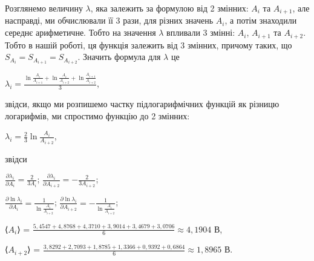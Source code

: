 \documentclass[12pt,a4paper]{article}
\begin{document}
    \vspace{1em} %

    Розглянемо величину $\lambda$, яка залежить за формулою від 2 змінних: $A_i$ та $A_{i+1}$, але насправді, ми обчислювали її 3 рази, для різних значень $A_i$, а потім знаходили середнє арифметичне.
    Тобто на значення $\lambda$ впливали 3 змінні: $A_i$, $A_{i+1}$ та $A_{i+2}$. Тобто в нашій роботі, ця функція залежить від 3 змінних, причому таких, що $S_{A_i} = S_{A_{i+1}} = S_{A_{i+2}}$.
    Значить формула для $\lambda$ це 
        
    \begin{center}
        $\displaystyle \lambda_i = \frac{\ln \frac{A_i}{A_{i+1}} + \ln \frac{A_i}{A_{i+2}} + \ln \frac{A_{i+1}}{A_{i+2}}}{3}$,
    \end{center}

    звідси, якщо ми розпишемо частку підлогарифмічних функцій як різницю логарифмів, ми спростимо функцію до 2 змінних:

    \begin{center}
        $\displaystyle \lambda_i = \frac{2}{3} \ln \frac{A_i}{A_{i+2}}$,
    \end{center}

    звідси

    \begin{center}
        $\displaystyle \frac{\partial \lambda_i}{\partial A_i} = \frac{2}{3A_i}$; $\displaystyle \frac{\partial \lambda_i}{\partial A_{i+2}} = -\frac{2}{3A_{i+2}}$;
    \end{center}

    \begin{center}
        $\displaystyle \frac{\partial \ln \lambda_i}{\partial A_i} = \frac{1}{\ln \frac{A_i}{A_{i+2}}}$; $\displaystyle \frac{\partial \ln \lambda_i}{\partial A_{i+2}} = -\frac{1}{\ln \frac{A_i}{A_{i+2}}}$;
    \end{center}

    \begin{center}
        ⟨$\displaystyle A_i$⟩ = $\displaystyle \frac{5,4547 + 4,8768 + 4,3710 + 3,9014 + 3,4679 + 3,0706}{6} \approx 4,1904$ В,
    \end{center}

    \begin{center}
        ⟨$\displaystyle A_{i+2}$⟩ = $\displaystyle \frac{3,8292 + 2,7093 + 1,8785 + 1,3366 + 0,9392 + 0,6864}{6} \approx 1,8965$ В.
    \end{center}













\end{document}
